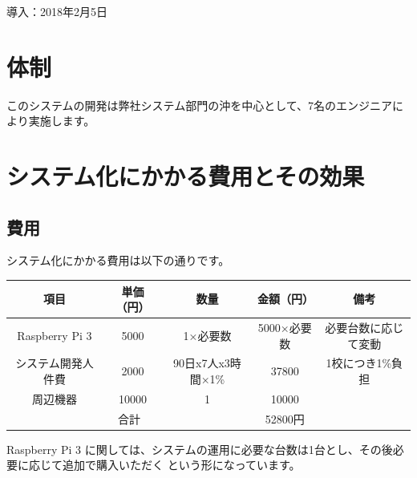 \documentclass[a4j,titlepage]{ujarticle}
\begin{document}
導入：2018年2月5日

\section{体制}
このシステムの開発は弊社システム部門の沖を中心として、7名のエンジニアにより実施します。

\section{システム化にかかる費用とその効果}
\subsection{費用}
システム化にかかる費用は以下の通りです。

\begin{table}[htb]
  \begin{tabular}{|c|c|c|c|c|} \hline
    項目 & 単価（円） & 数量 & 金額（円） & 備考 \\ \hline
     Raspberry Pi 3 &  5000&  1×必要数&  5000×必要数& 必要台数に応じて変動 \\ \hline
     システム開発人件費&  2000& 90日x7人x3時間×1\%&37800&1校につき1\%負担  \\ \hline
     周辺機器&  10000&  1&  10000&  \\ \hline
    \multicolumn{3}{|c|}{合計}& 52800円 &  \\ \hline
  \end{tabular}
\end{table}

Raspberry Pi 3 に関しては、システムの運用に必要な台数は1台とし、その後必要に応じて追加で購入いただく
という形になっています。

\end{document}
